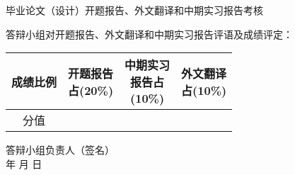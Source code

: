 \thispagestyle{empty}
\begin{center}
\stfangsong\sanhao 毕业论文（设计）开题报告、外文翻译和中期实习报告考核
\end{center}
\songti\sihao 答辩小组对开题报告、外文翻译和中期实习报告评语及成绩评定：
\vspace{8cm}

{
\hspace{3cm} \songti\xiaosi
\begin{tabular}{|c|c|c|c|}
    \hline
    成绩比例 & \parbox[t]{4em}{开题报告\\[-3.5em]占(20\%)} &
               \parbox[t]{4em}{中期实习\\[-3.5em]报告占\\[-3.5em](10\%)} &
               \parbox[t]{4em}{外文翻译\\[-3.5em]占(10\%)} \\

    \hline
    分值   & & &  \\
    \hline
\end{tabular}
}
\vspace{2cm}
\begin{flushright}
    答辩小组负责人（签名）\;\underline{\hspace{4em}}\\
    年 \quad 月 \quad 日
\end{flushright}

